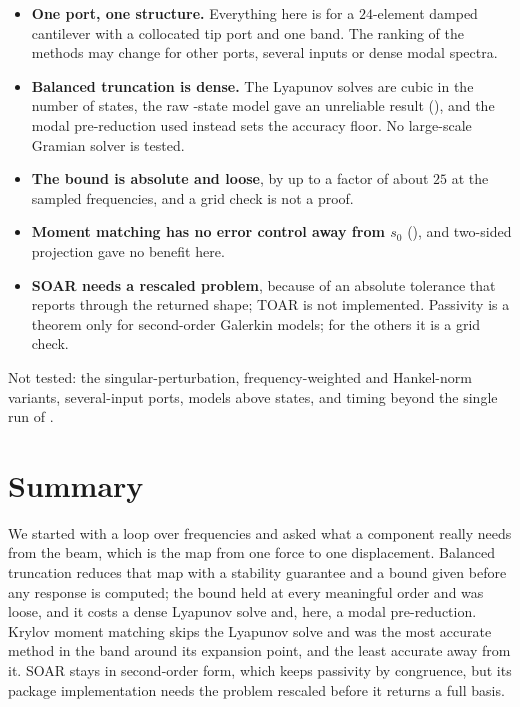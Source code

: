 \begin{limitsbox}
\begin{itemize}
\item \textbf{One port, one structure.} Everything here is for a $24$-element damped cantilever with a collocated tip port and one band. The ranking of the methods may change for other ports, several inputs or dense modal spectra.
\item \textbf{Balanced truncation is dense.} The Lyapunov solves are cubic in the number of states, the raw \cbtNState{}-state model gave an unreliable result (), and the modal pre-reduction used instead sets the accuracy floor. No large-scale Gramian solver is tested.
\item \textbf{The bound is absolute and loose}, by up to a factor of about $25$ at the sampled frequencies, and a grid check is not a proof.
\item \textbf{Moment matching has no error control away from $s_0$} (), and two-sided projection gave no benefit here.
\item \textbf{SOAR needs a rescaled problem}, because of an absolute tolerance that reports through the returned shape; TOAR is not implemented. Passivity is a theorem only for second-order Galerkin models; for the others it is a grid check.
\end{itemize}
Not tested: the singular-perturbation, frequency-weighted and Hankel-norm variants, several-input ports, models above \cbtNState{} states, and timing beyond the single run of .
\end{limitsbox}

\section{Summary}\label{sec:bt-summary}

We started with a loop over frequencies and asked what a component really needs from the beam, which is the map from one force to one displacement. Balanced truncation reduces that map with a stability guarantee and a bound given before any response is computed; the bound held at every meaningful order and was loose, and it costs a dense Lyapunov solve and, here, a modal pre-reduction. Krylov moment matching skips the Lyapunov solve and was the most accurate method in the band around its expansion point, and the least accurate away from it. SOAR stays in second-order form, which keeps passivity by congruence, but its package implementation needs the problem rescaled before it returns a full basis.

